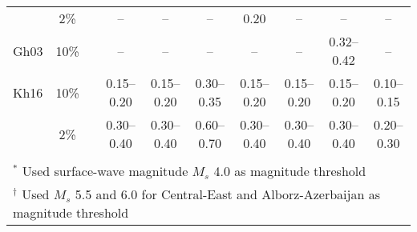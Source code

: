 \begin{table*}[t]
{\begin{tabular}{lccccccccc}
            &   2\%  &&   --        &   --        &   --        &   0.20      &   --        &     --      &     --      \\
    Gh03    &  10\%  &&   --        &   --        &   --        &   --        &   --        & 0.32--0.42  &     --      \\
    Kh16    &  10\%  &&  0.15--0.20 & 0.15--0.20  & 0.30--0.35  & 0.15--0.20  & 0.15--0.20  & 0.15--0.20  & 0.10--0.15  \\
            &   2\%  &&  0.30--0.40 & 0.30--0.40  & 0.60--0.70  & 0.30--0.40  & 0.30--0.40  & 0.30--0.40  & 0.20--0.30  \\
    \hline                                                                                                              \\[-1.6ex]
    \multicolumn{10}{l}{\small{${}^{*}$ Used surface-wave magnitude $M_s$ 4.0 as magnitude threshold}}                  \\
    \multicolumn{10}{l}{\small{${}^{\dagger}$ Used $M_s$ 5.5 and 6.0 for Central-East and Alborz-Azerbaijan as magnitude threshold}}
\end{tabular}
}
\label{tab:pga}
\end{table*}
